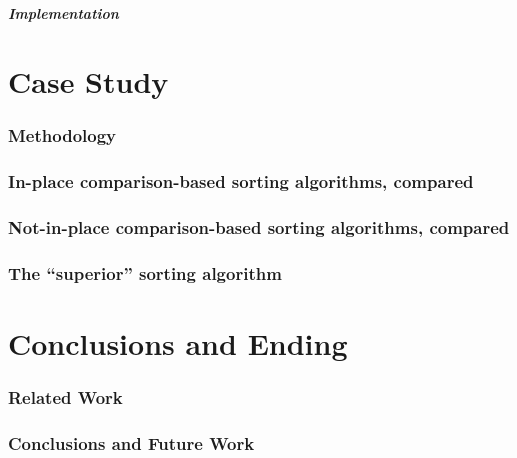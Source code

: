 \documentclass[a4paper]{article}
\begin{document}
                \subsubsection*{Implementation}
    
    \newpage
    \part{Case Study}
    \setcounter{section}{0}
    \section{Methodology}
    \section{In-place comparison-based sorting algorithms, compared}
    \section{Not-in-place comparison-based sorting algorithms, compared}
    \section{The ``superior'' sorting algorithm}
    
    \newpage
    \part{Conclusions and Ending}
    \setcounter{section}{0}
    \section{Related Work}
    \section{Conclusions and Future Work}

    

    \newpage

    \printbibliography
\end{document}
